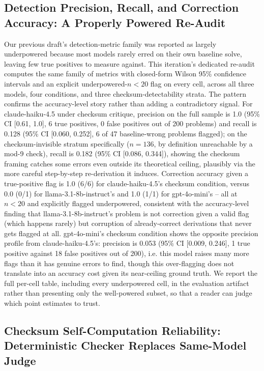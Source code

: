 \documentclass[11pt,letterpaper]{article}
\begin{document}
\subsection{Detection Precision, Recall, and Correction Accuracy: A Properly Powered Re-Audit}

Our previous draft's detection-metric family was reported as largely underpowered because most models rarely erred on their own baseline solve, leaving few true positives to measure against. This iteration's dedicated re-audit computes the same family of metrics with closed-form Wilson 95\% confidence intervals and an explicit underpowered-$n<20$ flag on every cell, across all three models, four conditions, and three checksum-detectability strata. The pattern confirms the accuracy-level story rather than adding a contradictory signal. For claude-haiku-4.5 under checksum critique, precision on the full sample is 1.0 (95\% CI [0.61, 1.0], 6 true positives, 0 false positives out of 200 problems) and recall is 0.128 (95\% CI [0.060, 0.252], 6 of 47 baseline-wrong problems flagged); on the checksum-invisible stratum specifically ($n=136$, by definition unreachable by a mod-9 check), recall is 0.182 (95\% CI [0.086, 0.344]), showing the checksum framing catches some errors even outside its theoretical ceiling, plausibly via the more careful step-by-step re-derivation it induces. Correction accuracy given a true-positive flag is 1.0 (6/6) for claude-haiku-4.5's checksum condition, versus 0.0 (0/1) for llama-3.1-8b-instruct's and 1.0 (1/1) for gpt-4o-mini's -- all at $n<20$ and explicitly flagged underpowered, consistent with the accuracy-level finding that llama-3.1-8b-instruct's problem is not correction given a valid flag (which happens rarely) but corruption of already-correct derivations that never gets flagged at all. gpt-4o-mini's checksum condition shows the opposite precision profile from claude-haiku-4.5's: precision is 0.053 (95\% CI [0.009, 0.246], 1 true positive against 18 false positives out of 200), i.e. this model raises many more flags than it has genuine errors to find, though this over-flagging does not translate into an accuracy cost given its near-ceiling ground truth. We report the full per-cell table, including every underpowered cell, in the evaluation artifact rather than presenting only the well-powered subset, so that a reader can judge which point estimates to trust.

\subsection{Checksum Self-Computation Reliability: Deterministic Checker Replaces Same-Model Judge}
\end{document}
